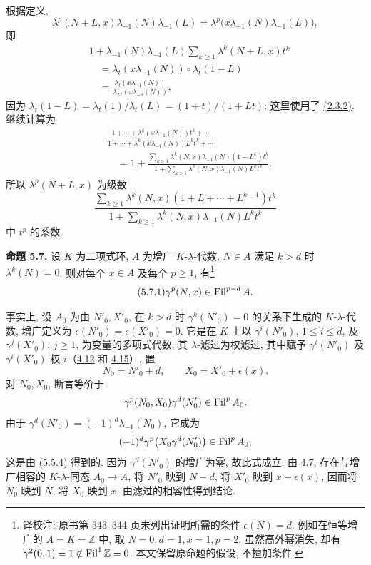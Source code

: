 根据定义,
\[
 \lambda^p(N+L,x)\lambda_{-1}(N)\lambda_{-1}(L)
 =\lambda^p\bigl(x\lambda_{-1}(N)\lambda_{-1}(L)\bigr),
\]
即
\[
 \begin{aligned}
 &1+\lambda_{-1}(N)\lambda_{-1}(L)
       \sum_{k\ge1}\lambda^k(N+L,x)t^k\\
 &\quad=\lambda_t(x\lambda_{-1}(N))\circ\lambda_t(1-L)\\
 &\quad=\frac{\lambda_t(x\lambda_{-1}(N))}
                 {\lambda_{Lt}(x\lambda_{-1}(N))},
 \end{aligned}
\]
因为 \(\lambda_t(1-L)=\lambda_t(1)/\lambda_t(L)=(1+t)/(1+Lt)\); 这里使用了 \hyperlink{sga6.e05.eq.2-3-2}{(2.3.2)}. 继续计算为
\[
 \begin{aligned}
 &\frac{1+\cdots+\lambda^k(x\lambda_{-1}(N))t^k+\cdots}
        {1+\cdots+\lambda^k(x\lambda_{-1}(N))L^kt^k+\cdots}\\
 &\quad=1+\frac{\displaystyle\sum_{k\ge1}
        \lambda^k(N,x)\lambda_{-1}(N)(1-L^k)t^k}
        {\displaystyle1+\sum_{k\ge1}
        \lambda^k(N,x)\lambda_{-1}(N)L^kt^k}.
 \end{aligned}
\]
所以 \(\lambda^p(N+L,x)\) 为级数
\[
  \frac{\displaystyle\sum_{k\ge1}\lambda^k(N,x)
        (1+L+\cdots+L^{k-1})t^k}
       {\displaystyle 1+\sum_{k\ge1}\lambda^k(N,x)
        \lambda_{-1}(N)L^k t^k}
\]
中 \(t^p\) 的系数.

\textbf{命题 5.7.} 设 \(K\) 为二项式环, \(A\) 为增广 \(K\)-\(\lambda\)-代数, \(N\in A\) 满足 \(k>d\) 时 \(\lambda^k(N)=0\). 则对每个 \(x\in A\) 及每个 \(p\ge1\), 有\footnote{译校注: 原书第 343--344 页未列出证明所需的条件 \(\epsilon(N)=d\). 例如在恒等增广的 \(A=K=\mathbb Z\) 中, 取 \(N=0,d=1,x=1,p=2\), 虽然高外幂消失, 却有 \(\gamma^2(0,1)=1\notin\operatorname{Fil}^1\mathbb Z=0\). 本文保留原命题的假设, 不擅加条件.}
\begin{equation}\tag{5.7.1}
  \gamma^p(N,x)\in\operatorname{Fil}^{p-d}A.
\end{equation}

事实上, 设 \(A_0\) 为由 \(N'_0,X'_0\), 在 \(k>d\) 时 \(\gamma^k(N'_0)=0\) 的关系下生成的 \(K\)-\(\lambda\)-代数, 增广定义为 \(\epsilon(N'_0)=\epsilon(X'_0)=0\). 它是在 \(K\) 上以 \(\gamma^i(N'_0)\), \(1\le i\le d\), 及 \(\gamma^j(X'_0)\), \(j\ge1\), 为变量的多项式代数; 其 \(\lambda\)-滤过为权滤过, 其中赋予 \(\gamma^i(N'_0)\) 及 \(\gamma^i(X'_0)\) 权 \(i\)（\hyperlink{sga6.e05.prop.4-12}{4.12} 和 \hyperlink{sga6.e05.cor.4-15}{4.15}）. 置
\[
  N_0=N'_0+d,
  \qquad X_0=X'_0+\epsilon(x).
\]
对 \(N_0,X_0\), 断言等价于
\[
  \gamma^p(N_0,X_0)\gamma^d(N'_0)\in\operatorname{Fil}^pA_0.
\]
由于 \(\gamma^d(N'_0)=(-1)^d\lambda_{-1}(N_0)\), 它成为
\[
  (-1)^d\gamma^p\bigl(X_0\gamma^d(N'_0)\bigr)\in\operatorname{Fil}^pA_0,
\]
这是由 \hyperlink{sga6.e05.eq.5-5-4}{(5.5.4)} 得到的. 因为 \(\gamma^d(N'_0)\) 的增广为零, 故此式成立. 由 \hyperlink{sga6.e05.prop.4-7}{4.7}, 存在与增广相容的 \(K\)-\(\lambda\)-同态 \(A_0\to A\), 将 \(N'_0\) 映到 \(N-d\), 将 \(X'_0\) 映到 \(x-\epsilon(x)\), 因而将 \(N_0\) 映到 \(N\), 将 \(X_0\) 映到 \(x\). 由滤过的相容性得到结论.

